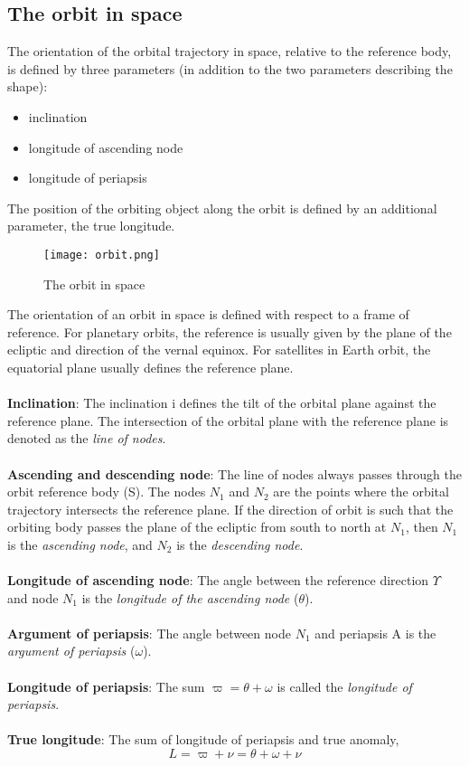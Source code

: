 \documentclass[Orbiter Developer Manual.tex]{subfiles}
\begin{document}
\subsection{The orbit in space}

The orientation of the orbital trajectory in space, relative to the reference body, is defined by three parameters (in addition to the two parameters describing the shape):
\begin{itemize}
\item inclination
\item longitude of ascending node
\item longitude of periapsis
\end{itemize}

\noindent
The position of the orbiting object along the orbit is defined by an additional parameter, the true longitude.

\begin{figure}[H]
  \centering
  \texttt{[image: orbit.png]}
  \caption{The orbit in space}
\end{figure}

\noindent
The orientation of an orbit in space is defined with respect to a frame of reference. For planetary orbits, the reference is usually given by the plane of the ecliptic and direction of the vernal equinox. For satellites in Earth orbit, the equatorial plane usually defines the reference plane.\\
\\
\textbf{Inclination}: The inclination i defines the tilt of the orbital plane against the reference plane. The intersection of the orbital plane with the reference plane is denoted as the \textit{line of nodes}.\\
\\
\textbf{Ascending and descending node}: The line of nodes always passes through the orbit reference body (S).
The nodes $N_{1}$ and $N_{2}$ are the points where the orbital trajectory intersects the reference plane. If the direction of orbit is such that the orbiting body passes the plane of the ecliptic from south to north at $N_{1}$, then $N_{1}$ is the \textit{ascending node}, and $N_{2}$ is the \textit{descending node}.\\
\\
\textbf{Longitude of ascending node}: The angle between the reference direction $\Upsilon$ and node $N_{1}$ is the \textit{longitude of the ascending node} ($\theta$).\\
\\
\textbf{Argument of periapsis}: The angle between node $N_{1}$ and periapsis A is the \textit{argument of periapsis} ($\omega$).\\
\\
\textbf{Longitude of periapsis}: The sum $\varpi = \theta + \omega$ is called the \textit{longitude of periapsis}.\\
\\
\textbf{True longitude}: The sum of longitude of periapsis and true anomaly,
\[ L = \varpi + \nu = \theta + \omega + \nu \]
\end{document}
